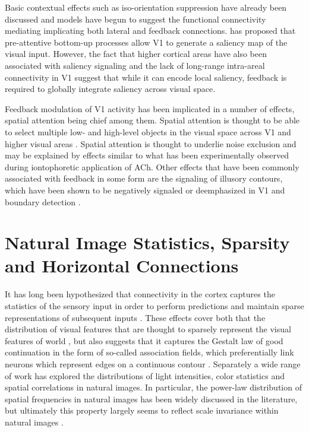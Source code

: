 Basic contextual effects such as iso-orientation suppression have
already been discussed and models have begun to suggest the functional
connectivity mediating implicating both lateral and feedback
connections. \cite{Li2002} has proposed that pre-attentive
bottom-up processes allow V1 to generate a saliency map of the visual
input. However, the fact that higher cortical areas have also been
associated with saliency signaling and the lack of long-range
intra-areal connectivity in V1 suggest that while it can encode local
saliency, feedback is required to globally integrate saliency across
visual space.

Feedback modulation of V1 activity has been implicated in a number of
effects, spatial attention being chief among them. Spatial attention
is thought to be able to select multiple low- and high-level objects in
the visual space across V1 and higher visual areas
\citep{McMains2004}. Spatial attention is thought to underlie noise
exclusion \citep{Dosher2000} and may be explained by effects similar
to what has been experimentally observed during iontophoretic application
of ACh. Other effects that have been commonly associated with
feedback in some form are the signaling of illusory contours, which
have been shown to be negatively signaled or deemphasized in V1
\citep{Ramsden2001} and boundary detection \citep{Poort2012}.

\section{Natural Image Statistics, Sparsity and Horizontal Connections}

It has long been hypothesized that connectivity in the cortex captures
the statistics of the sensory input in order to perform predictions
and maintain sparse representations of subsequent inputs \citep{Field1993,
  Simoncelli2001}. These effects cover both that the distribution of visual
features that are thought to sparsely represent the visual features of
world \citep{Olshausen1996}, but also suggests that it captures the
Gestalt law of good continuation in the form of so-called association
fields, which preferentially link neurons which represent edges on a
continuous contour \citep{Field1993}. Separately a wide range of work
has explored the distributions of light intensities, color statistics
and spatial correlations in natural images. In particular, the
power-law distribution of spatial frequencies in natural images has
been widely discussed in the literature, but ultimately this property
largely seems to reflect scale invariance within natural images
\citep{Ruderman1997}.

